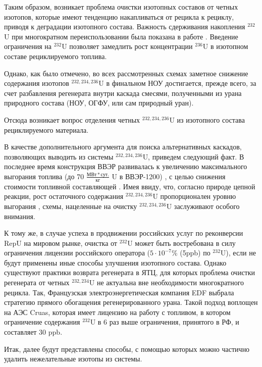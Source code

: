 Таким образом, возникает проблема очистки изотопных составов от четных изотопов, которые имеют тенденцию накапливаться от рецикла к рециклу, приводя к деградации изотопного состава.
Важность сдерживания накопления $^{232}$U при многократном переиспользовании была показана в работе \cite{smirnovEvolutionIsotopicComposition2012}.
Введение ограничения на $^{232}$U позволяет замедлить рост концентрации $^{236}$U в изотопном составе рециклируемого топлива.

Однако, как было отмечено, во всех рассмотренных схемах заметное снижение содержания изотопов $^{232,234,236}$U в финальном НОУ достигается, прежде всего, за счет разбавления регенерата внутри каскада смесями, полученными из урана природного состава (НОУ, ОГФУ, или сам природный уран).

Отсюда возникает вопрос отделения четных $^{232,234,236}$U из изотопного состава рециклируемого материала.

В качестве дополнительного аргумента для поиска альтернативных каскадов, позволяющих выводить из системы $^{232,234,236}$U, приведем следующий факт.
В последнее время конструкция ВВЭР развивалась к увеличению максимального выгорания топлива (до 70 $\frac{МВт*сут.}{кг}$ U в ВВЭР-1200) \cite{asmolovNewGenerationFirstofthe2017}, с целью снижения стоимости топливной составляющей \cite{andrianovaPovyshenievygoraniyaToplivaVVER2008}.
Имея ввиду, что, согласно природе цепной реакции, рост остаточного содержания $^{232,234,236}$U пропорционален уровню выгорания \cite{VeryHighBurnups2006}, схемы, нацеленные на очистку $^{232,234,236}$U заслуживают особого внимания.

К тому же, в случае успеха в продвижении российских услуг по реконверсии RepU на мировом рынке, очистка от $^{232}$U может быть востребована в силу ограничения лицензии российского оператора ($5\cdot10^{-7}$\% (5ppb) по $^{232}$U), если не будут применены иные способы улучшения изотопного состава.
Однако существуют практики возврата регенерата в ЯТЦ, для которых проблема очистки регенерата от четных $^{232,234}$U не актуальна вне необходимости многократного рецикла. Так, Французская электроэнергетическая компания EDF выбрала стратегию прямого обогащения регенерированного урана. Такой подход воплощен на АЭС Cruas, которая имеет лицензию на работу с топливом, в котором ограничение содержания $^{232}$U в 6 раз выше ограничения, принятого в РФ, и составляет 30 ppb.

Итак, далее будут представлены способы, с помощью которых можно частично удалить нежелательные изотопы из системы.

